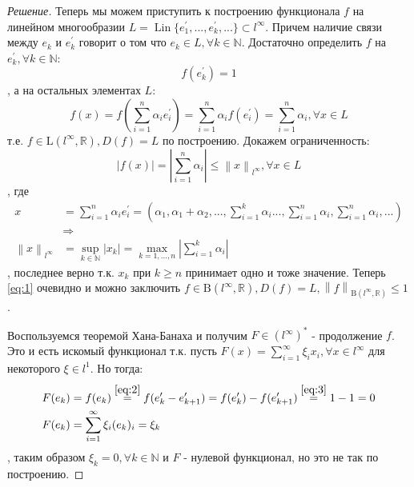 \documentclass[12pt,a4paper]{article}
\theoremstyle{definition}
\newenvironment{solution}
{\renewcommand\qedsymbol{$\blacksquare$}\begin{proof}[Решение]}
{\end{proof}}
\newcommand{\Real}{\mathbb{R}}
\newcommand{\Natural}{\mathbb{N}}
\newcommand{\norm}[1]{\left\lVert#1\right\rVert}
\newcommand{\conj}[1]{\left(#1\right)^*}
\newcommand{\bounded}[2]{\textrm{B}(#1, #2)}
\newcommand{\linear}[2]{\textrm{L}(#1, #2)}
\DeclareMathOperator{\Lin}{Lin}
\begin{document}
\begin{solution}
		Теперь мы можем приступить к построению функционала $f$ на линейном многообразии $L = \Lin\{e_1^\prime, ..., e_k^\prime, ...\} \subset l^\infty$. Причем наличие связи между $e_k$ и $e_k^\prime$ говорит о том что $e_k \in L, \forall k \in \Natural$. Достаточно определить $f$ на $e_k^\prime, \forall k \in \Natural$:
		\begin{equation}\label{eq:3}
			f(e_k^\prime) = 1
		\end{equation}
		, а на остальных элементах $L$:
		$$f(x) = f\left(\sum_{i=1}^{n}{\alpha_i e_i^\prime}\right) = \sum_{i=1}^{n}{\alpha_i f(e_i^\prime)} = \sum_{i=1}^{n}{\alpha_i}, \forall x \in L$$
		т.е. $f \in \linear{l^\infty}{\Real}, D(f) = L$ по построению. Докажем ограниченность:
		\begin{equation}\label{eq:1}
			|f(x)| = \left|\sum_{i=1}^{n}{\alpha_i}\right| \leq \norm{x}_{l^\infty}, \forall x \in L
		\end{equation}
		, где 
		\begin{align*}
			x &= \sum\limits_{i=1}^{n}{\alpha_i e_i^\prime} =
			\left(\alpha_1, \alpha_1 + \alpha_2, ..., \sum_{i=1}^{k}{\alpha_i} ..., \sum_{i=1}^{n}{\alpha_i}, \sum_{i=1}^{n}{\alpha_i}, ... \right) \\
			&\Rightarrow \\
			\norm{x}_{l^\infty} &= \sup_{k \in \Natural}{|x_k|} = \max_{k = 1, ..., n}{\left| \sum_{i=1}^{k}{\alpha_i} \right|}
		\end{align*}
		, последнее верно т.к. $x_k$ при $k \geq n$ принимает одно и тоже значение. Теперь \eqref{eq:1} очевидно и можно заключить $f \in \bounded{l^\infty}{\Real}, D(f) = L, \norm{f}_{\bounded{l^\infty}{\Real}} \leq 1$. 
		
		Воспользуемся теоремой Хана-Банаха и получим $F \in \conj{l^\infty}$ - продолжение $f$. Это и есть искомый функционал т.к. пусть $F(x) = \sum\limits_{i=1}^{\infty}{\xi_i x_i}, \forall x \in l^\infty$ для некоторого $\xi \in l^1$. Но тогда:
		\begin{align*}
			F(e_k) &= f(e_k) \overset{\eqref{eq:2}}{=} f( e_{k}^\prime - e_{k+1}^\prime) = f(e_{k} ^\prime) - f(e_{k+1}^\prime)  \overset{\eqref{eq:3}}{=} 1 - 1 = 0 \\
			F(e_k) &= \sum\limits_{i=1}^{\infty}{\xi_i (e_k)_{i}} = \xi_k
		\end{align*}
		, таким образом $\xi_k = 0, \forall k \in \Natural$ и $F$ - нулевой функционал, но это не так по построению. 
	\end{solution}

	\newpage
	
\end{document}
